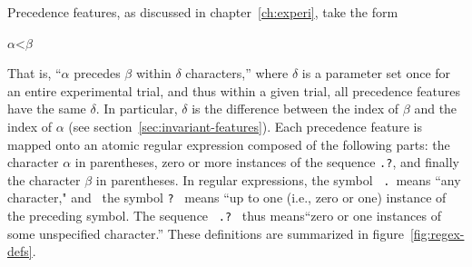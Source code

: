 {Precedence features, as discussed in chapter~\ref{ch:experi}, take the form
\begin{center}
$\alpha\text{<}\beta$
\end{center}
That is, ``$\alpha$ precedes $\beta$ within $\delta$ characters,'' where $\delta$ is 
a parameter set once for an entire experimental trial, and thus within a given trial, all precedence features
have the same $\delta$.  In particular, $\delta$ is the difference between the 
index of $\beta$ and the index of $\alpha$ (see section~\ref{sec:invariant-features}).
Each precedence feature is mapped onto an atomic regular expression composed of the following parts:
the character $\alpha$ in parentheses, zero or more instances of the sequence \texttt{.?},  and finally
the character $\beta$ in parentheses. In regular expressions, the symbol \, \texttt{.} \,means ``any character," and 
\, the symbol \texttt{?} \, means ``up to one (i.e., zero or one) instance of the preceding symbol. The sequence \, \texttt{.?} \, 
thus means``zero or one instances of some unspecified character.'' These definitions are summarized in figure~\ref{fig:regex-defs}.

}
